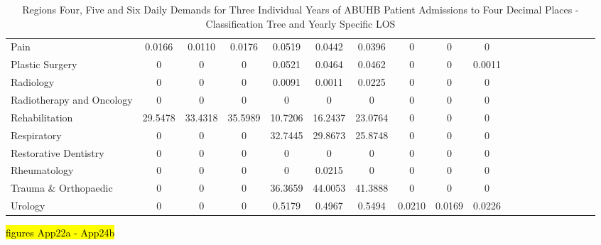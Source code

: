 \documentclass[thesis.tex]{subfiles}
\begin{document}
\begin{landscape}
\begin{table}[h!]
{\begin{tabular}{lcccccccccccccccccc}
Pain	&0.0166	&0.0110	&0.0176	&0.0519	&0.0442&	0.0396&	0	&0	&0\\
Plastic Surgery	&0	&0	&0&0.0521	&0.0464	&0.0462	&0	&0	&0.0011\\
Radiology	&0&	0	&0&	0.0091	&0.0011&	0.0225&	0&	0&	0\\
Radiotherapy and Oncology	&0	&0	&0	&0	&0&	0	&0&	0&	0\\
Rehabilitation	&29.5478	&33.4318	&35.5989&10.7206	&16.2437&	23.0764	&0	&0	&0\\
Respiratory&	0&	0&	0&	32.7445	&29.8673	&25.8748&	0&	0	&0\\
Restorative Dentistry	&0	&0	&0	&0&	0&	0&	0	&0	&0\\
Rheumatology	&0&	0	&0	&0	&0.0215&	0&	0&	0	&0\\
Trauma \& Orthopaedic	&0&	0	&0	&36.3659&	44.0053	&41.3888	&0	&0&	0\\
Urology	&0	&0	&0	&0.5179	&0.4967	&0.5494	&0.0210	&0.0169&	0.0226\\\bottomrule
\end{tabular}  } 
\caption{Regions Four, Five and Six Daily Demands for Three Individual Years of ABUHB Patient Admissions to Four Decimal Places - Classification Tree and Yearly Specific LOS}
    \label{apptab:LinkedDemands10b}
\end{table}  
\end{landscape}
\hl{figures App22a - App24b}
\end{document}
